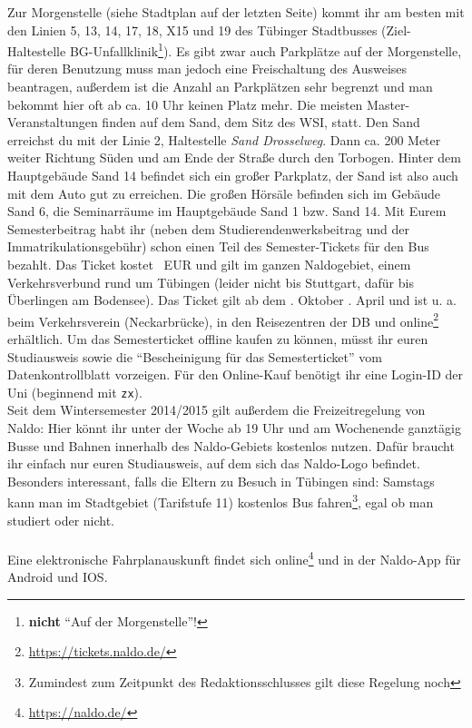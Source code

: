 Zur Morgenstelle (siehe Stadtplan auf der letzten Seite) kommt ihr am besten mit den Linien 5, 13, 14, 17, 18, X15 und 19 des Tübinger
Stadtbusses (Ziel-Haltestelle BG-Unfallklinik\footnote{\textbf{nicht} "`Auf der Morgenstelle"'!}). Es gibt zwar auch Parkplätze auf der Morgenstelle,
für deren Benutzung muss man jedoch eine Freischaltung des Ausweises beantragen, außerdem ist die Anzahl an Parkplätzen sehr begrenzt und man bekommt hier oft ab ca. 10 Uhr keinen Platz mehr.
\ifmaster
Die meisten Master-Veranstaltungen finden auf dem Sand, dem Sitz des WSI, statt. Den Sand erreichst du mit der Linie 2, Haltestelle \emph{Sand Drosselweg}. Dann ca. 200 Meter weiter Richtung Süden und am Ende der Straße durch den Torbogen. Hinter dem Hauptgebäude Sand 14 befindet sich ein großer Parkplatz, der Sand ist also auch mit dem Auto gut zu erreichen. Die großen Hörsäle befinden sich im Gebäude Sand 6, die Seminarräume im Hauptgebäude Sand 1 bzw. Sand 14.
\fi
Mit Eurem Semesterbeitrag habt ihr (neben dem Studierendenwerksbeitrag und der Immatrikulationsgebühr) schon einen Teil des Semester-Tickets für den Bus bezahlt.
Das Ticket kostet \ticketpreis~EUR und gilt im ganzen Naldogebiet, einem Verkehrsverbund rund um
Tübingen (leider nicht bis Stuttgart, dafür bis Überlingen am Bodensee). Das Ticket gilt ab dem 
. Oktober
\fi
{}. April
\fi 
 und ist u. a. beim Verkehrsverein (Neckarbrücke), in den Reisezentren der DB und online\footnote{\url{https://tickets.naldo.de/}} erhältlich. Um das Semesterticket offline kaufen zu können, müsst ihr euren Studiausweis sowie die "`Bescheinigung für das Semesterticket"' vom Datenkontrollblatt vorzeigen. Für den Online-Kauf benötigt ihr eine Login-ID der Uni (beginnend mit \texttt{zx}).\\
Seit dem Wintersemester 2014/2015 gilt außerdem die Freizeitregelung von Naldo: Hier könnt ihr unter der Woche ab 19 Uhr und am Wochenende ganztägig Busse und Bahnen innerhalb des Naldo-Gebiets kostenlos nutzen. Dafür braucht ihr einfach nur euren Studiausweis, auf dem sich das Naldo-Logo befindet.
Besonders interessant, falls die Eltern zu Besuch in Tübingen sind: Samstags kann man im Stadtgebiet (Tarifstufe 11) kostenlos Bus fahren\footnote{Zumindest zum Zeitpunkt des Redaktionsschlusses gilt diese Regelung noch}, egal ob man studiert oder nicht. \\\\
Eine elektronische Fahrplanauskunft findet sich online\footnote{\url{https://naldo.de/}} und in der Naldo-App für Android und IOS.

